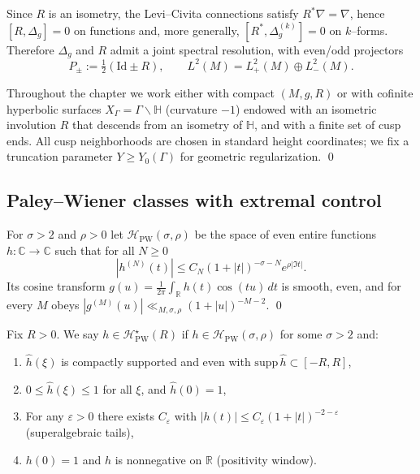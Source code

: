 \begin{remark}
\label{rem:commutation}
Since $R$ is an isometry, the Levi–Civita connections satisfy $R^*\nabla=\nabla$, hence $[R,\Delta_g]=0$ on functions and, more generally, $[R^*,\Delta_g^{(k)}]=0$ on $k$–forms. Therefore $\Delta_g$ and $R$ admit a joint spectral resolution, with even/odd projectors
\[
P_\pm := \tfrac12(\mathrm{Id}\pm R),\qquad L^2(M)=L^2_+(M)\oplus L^2_-(M).
\] 
\end{remark}

\begin{definition}
\label{def:model-ends}
Throughout the chapter we work either with compact $(M,g,R)$ or with cofinite hyperbolic surfaces $X_\Gamma=\Gamma\backslash\mathbb H$ (curvature $-1$) endowed with an isometric involution $R$ that descends from an isometry of $\mathbb H$, and with a finite set of cusp ends. All cusp neighborhoods are chosen in standard height coordinates; we fix a truncation parameter $Y\ge Y_0(\Gamma)$ for geometric regularization. \qed
\end{definition}


\subsection{Paley–Wiener classes with extremal control}
\label{subsec:ch6-part1-PW-classes} \relax \hspace{0pt}
\begin{definition}
\label{def:PW-quant}
For $\sigma>2$ and $\rho>0$ let $\mathcal H_{\mathrm{PW}}(\sigma,\rho)$ be the space of even entire functions $h:\mathbb C\to\mathbb C$ such that for all $N\ge0$
\[
|h^{(N)}(t)|\le C_N (1+|t|)^{-\sigma-N} e^{\rho |\Im t|}.
\]
Its cosine transform $g(u)=\tfrac1{2\pi}\int_{\mathbb R} h(t)\cos(tu)\,dt$ is smooth, even, and for every $M$ obeys $|g^{(M)}(u)|\ll_{M,\sigma,\rho} (1+|u|)^{-M-2}$. \qed
\end{definition}

\begin{definition}
\label{def:PW-extremal}
Fix $R>0$. We say $h\in \mathcal H_{\mathrm{PW}}^\star(R)$ if $h\in\mathcal H_{\mathrm{PW}}(\sigma,\rho)$ for some $\sigma>2$ and:
\begin{enumerate}[label=\textnormal{(E\arabic*)},leftmargin=9mm]
\item $\widehat h(\xi)$ is compactly supported and even with $\mathrm{supp}\,\widehat h\subset[-R,R]$,
\item $0\le \widehat h(\xi)\le 1$ for all $\xi$, and $\widehat h(0)=1$,
\item For any $\varepsilon>0$ there exists $C_\varepsilon$ with $|h(t)|\le C_\varepsilon (1+|t|)^{-2-\varepsilon}$ (superalgebraic tails),
\item $h(0)=1$ and $h$ is nonnegative on $\mathbb R$ (positivity window).
\end{enumerate}
\end{definition}

